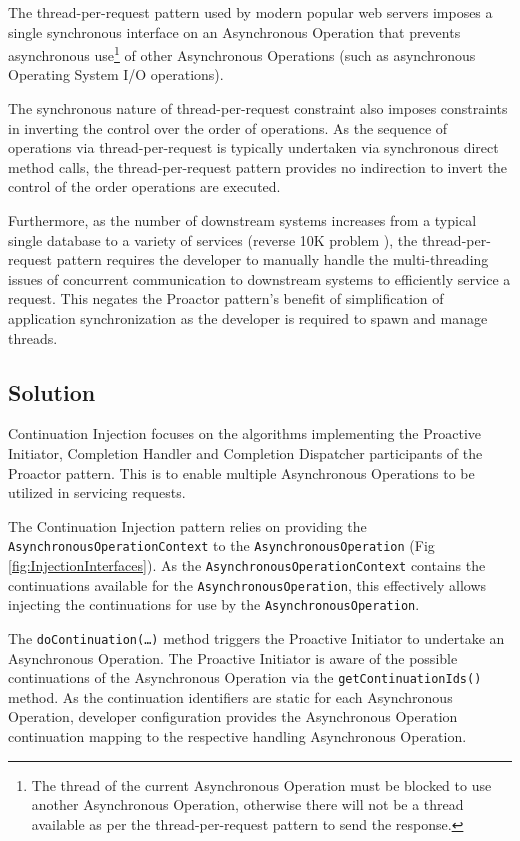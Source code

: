 \documentclass[prodmode]{style/acmlarge}
\begin{document}
The thread-per-request pattern used by modern popular web servers imposes a
single synchronous interface on an Asynchronous Operation that prevents
asynchronous use\footnote{The thread of the current Asynchronous Operation must
be blocked to use another Asynchronous Operation, otherwise there will not be a
thread available as per the thread-per-request pattern to send the response.} of
other Asynchronous Operations (such as asynchronous Operating System I/O
operations).

The synchronous nature of thread-per-request constraint also imposes constraints
in inverting the control over the order of operations.  As the sequence of
operations via thread-per-request is typically undertaken via synchronous direct
method calls, the thread-per-request pattern provides no indirection to invert
the control of the order operations are executed.

Furthermore, as the number of downstream systems increases from a typical single
database to a variety of services (reverse 10K problem
\cite{reverse-ten-k-problem}), the thread-per-request pattern requires the
developer to manually handle the multi-threading issues of concurrent
communication to downstream systems to efficiently service a request.  This
negates the Proactor pattern's benefit of simplification of application
synchronization \cite[p. 7]{proactor} as the developer is required to spawn and
manage threads.


\subsection{Solution}

Continuation Injection focuses on the algorithms implementing the Proactive
Initiator, Completion Handler and Completion Dispatcher participants of the
Proactor pattern.  This is to enable multiple Asynchronous Operations to be
utilized in servicing requests.

The Continuation Injection pattern relies on providing the
\texttt{AsynchronousOperationContext} to the \texttt{AsynchronousOperation} (Fig
\ref{fig:InjectionInterfaces}).  As the \texttt{AsynchronousOperationContext}
contains the continuations available for the \texttt{AsynchronousOperation},
this effectively allows injecting the continuations for use by the
\texttt{AsynchronousOperation}.

The \texttt{doContinuation(\ldots)} method triggers the Proactive Initiator to
undertake an Asynchronous Operation.  The Proactive Initiator is aware of the
possible continuations of the Asynchronous Operation via the
\texttt{getContinuationIds()} method.  As the continuation identifiers are
static for each Asynchronous Operation, developer configuration provides the
Asynchronous Operation continuation mapping to the respective handling
Asynchronous Operation.
\end{document}
